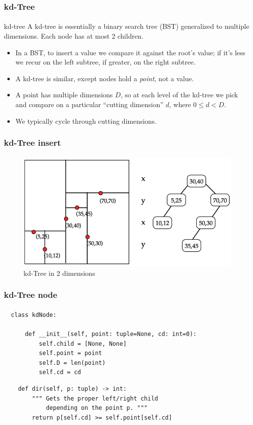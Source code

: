 \documentclass{beamer}                             %
\begin{document}
\begin{frame}
\frametitle{kd-Tree}
\framesubtitle{}
\begin{block}{kd-tree}
  A kd-tree is essentially a binary search tree (BST) generalized to multiple
  dimensions. Each node has at most 2 children.
\end{block}

\begin{itemize}[<+->]
  \item In a BST, to insert a value we compare it against the root's value; if
    it's less we recur on the left subtree, if greater, on the right subtree.
  \item A kd-tree is similar, except nodes hold a \emph{point}, not a value.
  \item A point has multiple dimensions \( D \), so at each
    level of the kd-tree we pick and compare on a particular
    \enquote{cutting dimension} \( d \), where \( 0 \leq d < D \).
  \item We typically cycle through cutting dimensions. 
\end{itemize}
\end{frame}

\begin{frame}
\frametitle{kd-Tree insert}
\framesubtitle{}

\begin{figure}[h!]
  \centering
  \includegraphics[scale=0.35]{kd-tree}
  \caption{kd-Tree in 2 dimensions}
\end{figure}
\end{frame}

\begin{frame}[fragile]
\frametitle{kd-Tree node}
\framesubtitle{}
\begin{verbatim}
  class kdNode:

      def __init__(self, point: tuple=None, cd: int=0):
          self.child = [None, None]
          self.point = point
          self.D = len(point)
          self.cd = cd
\end{verbatim}

\begin{verbatim}
    def dir(self, p: tuple) -> int:
        """ Gets the proper left/right child
            depending on the point p. """
        return p[self.cd] >= self.point[self.cd]
\end{verbatim}
\end{frame}
\end{document}
